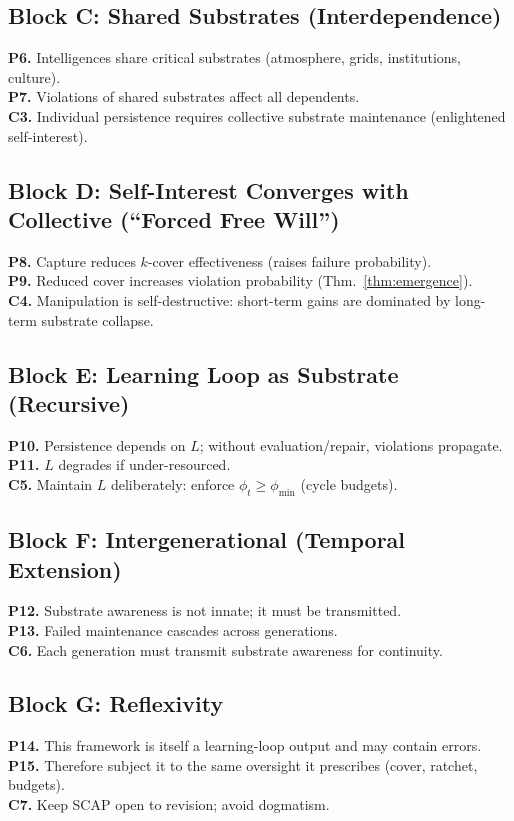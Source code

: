 \documentclass[11pt]{article}
\theoremstyle{definition}
\begin{document}
\subsection*{Block C: Shared Substrates (Interdependence)}
\textbf{P6.} Intelligences share critical substrates (atmosphere, grids, institutions, culture). \\
\textbf{P7.} Violations of shared substrates affect all dependents. \\
\textbf{C3.} Individual persistence requires collective substrate maintenance (enlightened self-interest).

\subsection*{Block D: Self-Interest Converges with Collective (``Forced Free Will'')}
\textbf{P8.} Capture reduces $k$-cover effectiveness (raises failure probability). \\
\textbf{P9.} Reduced cover increases violation probability (Thm.~\ref{thm:emergence}). \\
\textbf{C4.} Manipulation is self-destructive: short-term gains are dominated by long-term substrate collapse.

\subsection*{Block E: Learning Loop as Substrate (Recursive)}
\textbf{P10.} Persistence depends on $L$; without evaluation/repair, violations propagate. \\
\textbf{P11.} $L$ degrades if under-resourced. \\
\textbf{C5.} Maintain $L$ deliberately: enforce $\phi_t\ge \phi_{\min}$ (cycle budgets).

\subsection*{Block F: Intergenerational (Temporal Extension)}
\textbf{P12.} Substrate awareness is not innate; it must be transmitted. \\
\textbf{P13.} Failed maintenance cascades across generations. \\
\textbf{C6.} Each generation must transmit substrate awareness for continuity.

\subsection*{Block G: Reflexivity}
\textbf{P14.} This framework is itself a learning-loop output and may contain errors. \\
\textbf{P15.} Therefore subject it to the same oversight it prescribes (cover, ratchet, budgets). \\
\textbf{C7.} Keep SCAP open to revision; avoid dogmatism.
\end{document}
